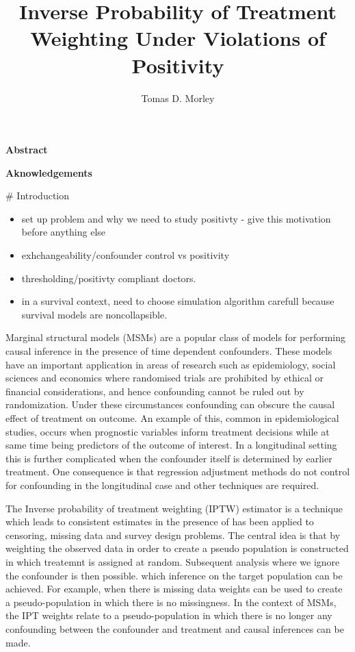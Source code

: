 \documentclass[11pt]{article}
\title{Inverse Probability of Treatment Weighting Under Violations of Positivity}
\author{Tomas D. Morley}
\providecommand{\tightlist}{%
      \setlength{\itemsep}{0pt}\setlength{\parskip}{0pt}}
\begin{document}
    
    
    \maketitle
    
    

    
    \newpage

     \textbf{Abstract}

    \newpage

    \textbf{Aknowledgements}

    \newpage

\tableofcontents{}

    \newpage

 \# Introduction

\begin{itemize}
\tightlist
\item
  set up problem and why we need to study positivty - give this
  motivation before anything else
\item
  exhchangeability/confounder control vs positivity
\item
  thresholding/positivty compliant doctors.
\item
  in a survival context, need to choose simulation algorithm carefull
  because survival models are noncollapsible.
\end{itemize}

Marginal structural models (MSMs) are a popular class of models for
performing causal inference in the presence of time dependent
confounders. These models have an important application in areas of
research such as epidemiology, social sciences and economics where
randomised trials are prohibited by ethical or financial considerations,
and hence confounding cannot be ruled out by randomization. Under these
circumstances confounding can obscure the causal effect of treatment on
outcome. An example of this, common in epidemiological studies, occurs
when prognostic variables inform treatment decisions while at same time
being predictors of the outcome of interest. In a longitudinal setting
this is further complicated when the confounder itself is determined by
earlier treatment. One consequence is that regression adjustment methods
do not control for confounding in the longitudinal case and other
techniques are required. \linebreak

The Inverse probability of treatment weighting (IPTW) estimator is a
technique which leads to consistent estimates in the presence of has
been applied to censoring, missing data and survey design problems. The
central idea is that by weighting the observed data in order to create a
pseudo population is constructed in which treatemnt is assigned at
random. Subsequent analysis where we ignore the confounder is then
possible. which inference on the target population can be achieved. For
example, when there is missing data weights can be used to create a
pseudo-population in which there is no missingness. In the context of
MSMs, the IPT weights relate to a pseudo-population in which there is no
longer any confounding between the confounder and treatment and causal
inferences can be made. \linebreak
\end{document}
